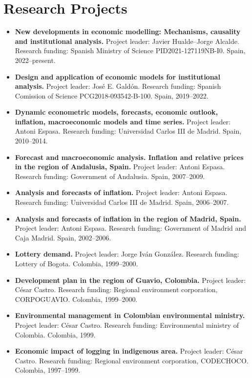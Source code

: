 \documentclass[11pt]{article}\usepackage[]{graphicx}\usepackage[usenames,dvipsnames]{xcolor}
\begin{document}
\section{Research Projects}
\begin{itemize}
  \item \textbf{New developments in economic modelling: Mechanisms, causality and institutional analysis.} Project leader: Javier Hualde--Jorge Alcalde. Research funding: Spanish Ministry of Science PID2021-127119NB-I0. Spain, 2022--present.
  \item \textbf{Design and application of economic models for institutional analysis.} Project leader: José E. Galdón. Research funding: Spanish Comission of Science PCG2018-093542-B-100. Spain, 2019--2022.
  \item \textbf{Dynamic econometric models, forecasts, economic outlook, inflation, macroeconomic models and time series.} Project leader: Antoni Espasa. Research funding: Universidad Carlos III de Madrid. Spain, 2010--2014.
  \item \textbf{Forecast and macroeconomic analysis. Inflation and relative prices in the region of Andalusia, Spain.} Project leader: Antoni Espasa. Research funding: Government of Andalusia. Spain, 2007--2009.
  \item \textbf{Analysis and forecasts of inflation.} Project leader: Antoni Espasa. Research funding: Universidad Carlos III de Madrid. Spain, 2006--2007.
  \item \textbf{Analysis and forecasts of inflation in the region of Madrid, Spain.} Project leader: Antoni Espasa. Research funding: Government of Madrid and Caja Madrid. Spain, 2002--2006.
  \item \textbf{Lottery demand.} Project leader: Jorge Iván González. Research funding: Lottery of Bogota. Colombia, 1999--2000.
  \item \textbf{Development plan in the region of Guavio, Colombia.} Project leader: César Castro. Research funding: Regional environment corporation, CORPOGUAVIO. Colombia, 1999--2000.
  \item \textbf{Environmental management in Colombian environmental ministry.} Project leader: César Castro. Research funding: Environmental ministry of Colombia. Colombia, 1999.
  \item \textbf{Economic impact of logging in indigenous area.} Project leader: César Castro. Research funding: Regional environment corporation, CODECHOCO. Colombia, 1997--1999.
\end{itemize}
\end{document}
